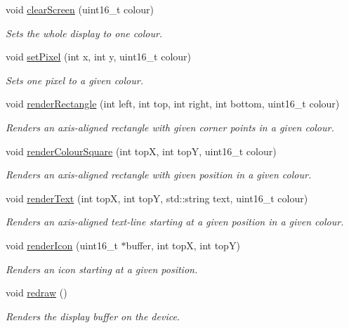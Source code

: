\begin{DoxyCompactItemize}
\item 
void \hyperlink{classDisplay_a905f9f783556b52da4655c541a5e3ea0}{clear\+Screen} (uint16\+\_\+t colour)
\begin{DoxyCompactList}\small\item\em Sets the whole display to one colour. \end{DoxyCompactList}\item 
void \hyperlink{classDisplay_a34d1063149dc9f36c43afd5066b0b3ce}{set\+Pixel} (int x, int y, uint16\+\_\+t colour)
\begin{DoxyCompactList}\small\item\em Sets one pixel to a given colour. \end{DoxyCompactList}\item 
void \hyperlink{classDisplay_aeadae3356ab6ef6bc101dd5c3ee1317d}{render\+Rectangle} (int left, int top, int right, int bottom, uint16\+\_\+t colour)
\begin{DoxyCompactList}\small\item\em Renders an axis-\/aligned rectangle with given corner points in a given colour. \end{DoxyCompactList}\item 
void \hyperlink{classDisplay_a94ad8f357b5fffdd4711a593e29003a8}{render\+Colour\+Square} (int topX, int topY, uint16\+\_\+t colour)
\begin{DoxyCompactList}\small\item\em Renders an axis-\/aligned rectangle with given position in a given colour. \end{DoxyCompactList}\item 
void \hyperlink{classDisplay_a9e72ead0a3cb23753b1fba042926ce88}{render\+Text} (int topX, int topY, std\+::string text, uint16\+\_\+t colour)
\begin{DoxyCompactList}\small\item\em Renders an axis-\/aligned text-\/line starting at a given position in a given colour. \end{DoxyCompactList}\item 
void \hyperlink{classDisplay_ad50ca28eb1147af9d31316bd2ad8ef6e}{render\+Icon} (uint16\+\_\+t $\ast$buffer, int topX, int topY)
\begin{DoxyCompactList}\small\item\em Renders an icon starting at a given position. \end{DoxyCompactList}\item 
void \hyperlink{classDisplay_a4fe6059ab67f9a11469ea53f4a5ddb0d}{redraw} ()\hypertarget{classDisplay_a4fe6059ab67f9a11469ea53f4a5ddb0d}{}\label{classDisplay_a4fe6059ab67f9a11469ea53f4a5ddb0d}

\begin{DoxyCompactList}\small\item\em Renders the display buffer on the device. \end{DoxyCompactList}\end{DoxyCompactItemize}
